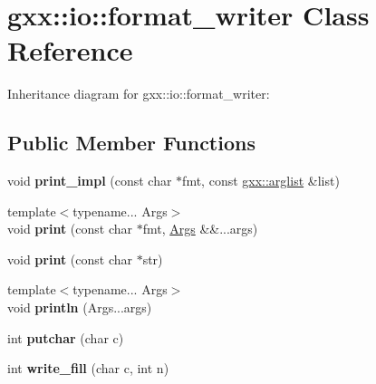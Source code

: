 \hypertarget{classgxx_1_1io_1_1format__writer}{}\section{gxx\+:\+:io\+:\+:format\+\_\+writer Class Reference}
\label{classgxx_1_1io_1_1format__writer}


Inheritance diagram for gxx\+:\+:io\+:\+:format\+\_\+writer\+:
\subsection*{Public Member Functions}
\begin{DoxyCompactItemize}
\item 
void {\bfseries print\+\_\+impl} (const char $\ast$fmt, const \hyperlink{classgxx_1_1arglist}{gxx\+::arglist} \&list)\hypertarget{classgxx_1_1io_1_1format__writer_a01a3431e84008b5adfda020e874b1fcb}{}\label{classgxx_1_1io_1_1format__writer_a01a3431e84008b5adfda020e874b1fcb}

\item 
{\footnotesize template$<$typename... Args$>$ }\\void {\bfseries print} (const char $\ast$fmt, \hyperlink{structArgs}{Args} \&\&...args)\hypertarget{classgxx_1_1io_1_1format__writer_a8e74d35d303875e1b1c5f2cb0d768a17}{}\label{classgxx_1_1io_1_1format__writer_a8e74d35d303875e1b1c5f2cb0d768a17}

\item 
void {\bfseries print} (const char $\ast$str)\hypertarget{classgxx_1_1io_1_1format__writer_a400643ef00c00601f672569d73882b71}{}\label{classgxx_1_1io_1_1format__writer_a400643ef00c00601f672569d73882b71}

\item 
{\footnotesize template$<$typename... Args$>$ }\\void {\bfseries println} (Args...\+args)\hypertarget{classgxx_1_1io_1_1format__writer_abc83ba815281c94ec2a5c9cd9550de3b}{}\label{classgxx_1_1io_1_1format__writer_abc83ba815281c94ec2a5c9cd9550de3b}

\item 
int {\bfseries putchar} (char c)\hypertarget{classgxx_1_1io_1_1format__writer_a4e4b84faa244ee84f84f9c0bf8107912}{}\label{classgxx_1_1io_1_1format__writer_a4e4b84faa244ee84f84f9c0bf8107912}

\item 
int {\bfseries write\+\_\+fill} (char c, int n)\hypertarget{classgxx_1_1io_1_1format__writer_a926d75097a61a778c425089993efb5f9}{}\label{classgxx_1_1io_1_1format__writer_a926d75097a61a778c425089993efb5f9}


\end{DoxyCompactItemize}
